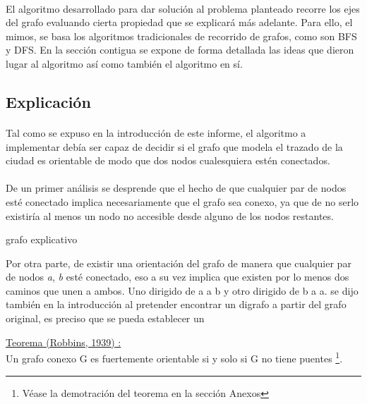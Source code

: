 \paragraph{}
El algoritmo desarrollado para dar solución al problema planteado recorre los ejes del grafo evaluando cierta propiedad que se explicará más adelante. Para ello, el mimos, se basa los algoritmos tradicionales de recorrido de grafos, como son BFS y DFS. En la sección contigua se expone de forma detallada las ideas que dieron lugar al algoritmo así como también el algoritmo en sí.

	
\subsection{Explicación}
\label{exp2}

\paragraph{}
Tal como se expuso en la introducción de este informe, el algoritmo a implementar debía ser capaz de decidir si el grafo que modela el trazado de la ciudad es orientable de modo que dos nodos cualesquiera estén conectados.

\paragraph{}
De un primer análisis se desprende que el hecho de que cualquier par de nodos esté conectado implica necesariamente que el grafo sea conexo, ya que de no serlo existiría al menos un nodo no accesible desde alguno de los nodos restantes.

\begin{center}
grafo explicativo
\end{center}

Por otra parte, de existir una orientación del grafo de manera que cualquier par de nodos \textit{a}, \textit{b} esté conectado, eso a su vez implica que existen por lo menos dos caminos que unen a ambos. Uno dirigido de a a b y otro dirigido de b a a.
se dijo también en la introducción al pretender encontrar un digrafo a partir del  grafo original, es preciso que se pueda establecer un 

\underline{Teorema (Robbins, 1939) :}\\
Un grafo conexo G es fuertemente orientable si y solo si G no tiene puentes \footnote{Véase la demotración del teorema en la sección Anexos}.
\label{robbins}

